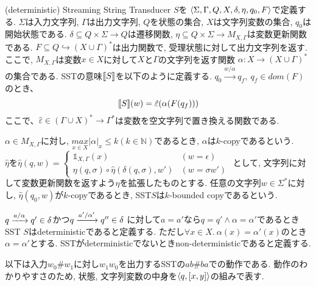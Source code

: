 \documentclass[uplatex,dvipdfmx,a4j]{jsreport}
\begin{document}
  \begin{definition}[SST] \label{def: SST}
    (deterministic) Streaming String Transducer $S$を
    ${\langle {\Sigma, \Gamma, Q, X, \delta, \eta, q_0, F} \rangle}$で定義する.
    $\Sigma$は入力文字列, $\Gamma$は出力文字列, $Q$を状態の集合, $X$は文字列変数の集合, $q_0$は開始状態である.
    $\delta \subseteq Q \times \Sigma \rightarrow Q$は遷移関数,
    $\eta \subseteq Q \times \Sigma \rightarrow M_{X, \Gamma}$は変数更新関数である.
    $F \subseteq Q \hookrightarrow (X \cup \Gamma)^*$は出力関数で, 受理状態に対して出力文字列を返す.
    ここで, $M_{X, \Gamma}$は変数$x \in X$に対して$X$と$\Gamma$の文字列を返す関数
    $\alpha: X \rightarrow (X \cup \Gamma)^*$の集合である.
    SSTの意味${[ \! [{S}] \! ]}$を以下のように定義する.
    $q_0 \overset{w / \alpha}{\longrightarrow} q_f,\ q_f \in dom(F)$のとき、
    \[
    {[ \! [{S}] \! ]}(w) = \hat{\varepsilon}(\alpha (F(q_f)))
    \]
    ここで、$\hat{\varepsilon} \in (\Gamma \cup X)^* \to \Gamma ^*$は変数を空文字列で置き換える関数である.

    $\alpha \in M_{X, \Gamma}$に対し,
    $\underset{x \in X}{max} |\alpha|_x \leq k (k \in \mathbb{N})$であるとき,
    $\alpha$は$k$-copyであるという. \\
    $\hat{\eta}$を$\hat{\eta}(q, w) =
    \begin{cases}
      \mathbb{1}_{X, \Gamma}(x) & (w = \epsilon) \\
      \eta(q, \sigma) \circ \hat{\eta}(\delta(q, \sigma), w') & (w = \sigma w')
    \end{cases}
    $
    として, 文字列に対して変数更新関数を返すよう$\eta$を拡張したものとする.
    任意の文字列$w \in \Sigma^*$に対し, $\hat{\eta}(q_0, w)$が$k$-copyであるとき,
    SST$S$は$k$-bounded copyであるという.

    $q \xrightarrow[]{a / \alpha} q' \in \delta$かつ$q \xrightarrow[]{a' / \alpha'} q'' \in \delta$
    に対して$a = a'$なら$q = q' \land \alpha = \alpha'$であるときSST $S$はdeterministicであると定義する.
    ただし$\forall x \in X.\ \alpha(x) = \alpha'(x)$のとき$\alpha = \alpha'$とする.
    SSTがdeterministicでないときnon-deterministicであると定義する.
  \end{definition}

  以下は入力$w_0 \# w_1$に対し$w_1w_0$を出力するSSTの$ab \# ba$での動作である.
  動作のわかりやすさのため, 状態, 文字列変数の中身を${\langle {q, [x, y]} \rangle}$の組みで表す.
\end{document}
